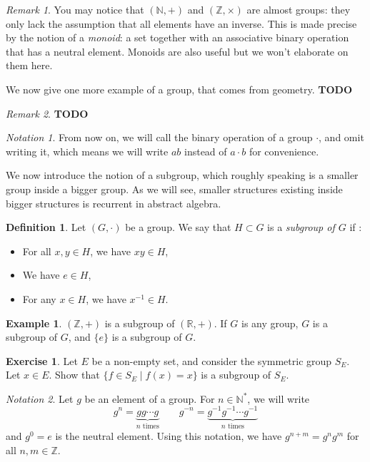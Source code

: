 \documentclass{book}
\newcommand{\N}{\mathbb{N}}
\newcommand{\Z}{\mathbb{Z}}
\newcommand{\R}{\mathbb{R}}
\newcommand{\todo}{\textbf{TODO}}
\theoremstyle{plain}
\theoremstyle{definition}
\newtheorem{definition}[theorem]{Definition}
\newtheorem{example}[theorem]{Example}
\newtheorem{exercise}{Exercise}[section]
\theoremstyle{remark}
\newtheorem*{remark}{Remark}
\newtheorem*{notation}{Notation}
\begin{document}
\begin{remark}
    You may notice that $(\N,+)$ and $(\Z,\times)$ are almost groups: they only lack the assumption that all elements have an inverse. This is made precise by the notion of a \emph{monoid}: a set together with an associative binary operation that has a neutral element. Monoids are also useful but we won't elaborate on them here.
\end{remark}

We now give one more example of a group, that comes from geometry.
\todo %

\begin{remark}
    \todo %
\end{remark}

\begin{notation}
    From now on, we will call the binary operation of a group $\cdot$, and omit writing it, which means we will write $ab$ instead of $a \cdot b$ for convenience.
\end{notation}

We now introduce the notion of a subgroup, which roughly speaking is a smaller group inside a bigger group. As we will see, smaller structures existing inside bigger structures is recurrent in abstract algebra.

\begin{definition}
    Let $(G,\cdot)$ be a group. We say that $H \subset G$ is a \emph{subgroup of $G$} if :
    \begin{itemize}
        \item For all $x,y \in H$, we have $xy \in H$,
        \item We have $e \in H$,
        \item For any $x \in H$, we have $x^{-1} \in H$.
    \end{itemize}
\end{definition}

\begin{example}
    $(\Z,+)$ is a subgroup of $(\R,+)$. If $G$ is any group, $G$ is a subgroup of $G$, and $\{e\}$ is a subgroup of $G$.
\end{example}

\begin{exercise}
    Let $E$ be a non-empty set, and consider the symmetric group $S_E$. Let $x \in E$. Show that $\{f \in S_E \mid f(x) = x\}$ is a subgroup of $S_E$.
\end{exercise}

\begin{notation}
    Let $g$ be an element of a group. For $n \in \N^*$, we will write
    \[g^n = \underbrace{gg \cdots g}_{n \text{ times}} \qquad g^{-n} = \underbrace{g^{-1}g^{-1} \cdots g^{-1}}_{n \text{ times}}\]
    and $g^0 = e$ is the neutral element. Using this notation, we have $g^{n+m} = g^n g^m$ for all $n,m \in \Z$.
\end{notation}
\end{document}
